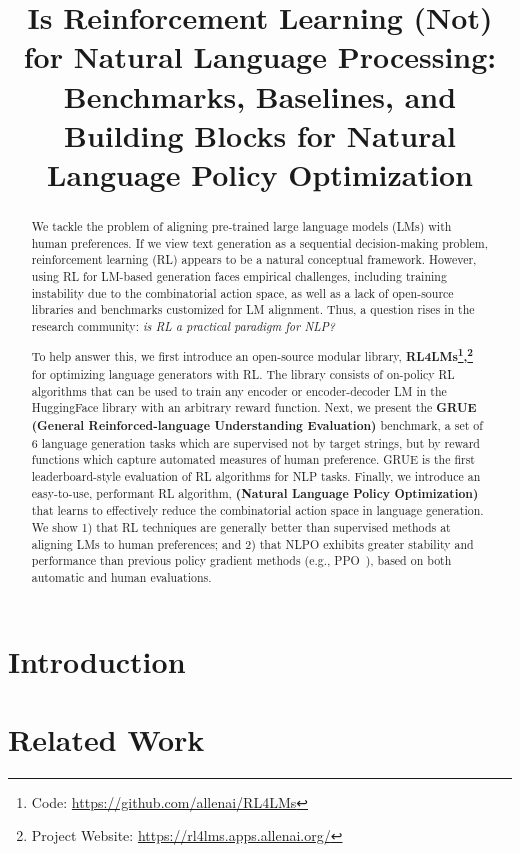 \title{Is Reinforcement Learning (Not) for Natural Language Processing: Benchmarks, Baselines, and Building Blocks for Natural Language Policy Optimization}

\begin{abstract}
{\let\thefootnote\relax{}} We tackle the problem of aligning pre-trained large language models (LMs) with human preferences. If we view text generation as a sequential decision-making problem, reinforcement learning (RL) appears to be a natural conceptual framework. However, using RL for LM-based generation faces empirical challenges, including training instability due to the combinatorial action space, as well as a lack of open-source libraries and benchmarks customized for LM alignment. Thus, a question rises in the research community:
\emph{is RL a practical paradigm for NLP?} 

To help answer this, we first introduce an open-source modular library,
\textbf{RL4LMs\footnote{Code: \url{https://github.com/allenai/RL4LMs}},\footnote{Project Website: \url{https://rl4lms.apps.allenai.org/}}} 
for optimizing language generators with RL. The library consists of on-policy RL algorithms that can be used to train any encoder or encoder-decoder LM in the HuggingFace library \citep{wolf2020transformers} with an arbitrary reward function. Next, we present the \textbf{GRUE (General Reinforced-language Understanding Evaluation)} benchmark, a set of 6 language generation tasks which are supervised not by target strings, but by reward functions which capture automated measures of human preference. GRUE is the first leaderboard-style evaluation of RL algorithms for NLP tasks. Finally, we introduce an easy-to-use, performant RL algorithm, \textbf{ (Natural Language Policy Optimization)} that learns to effectively reduce the combinatorial action space in language generation. We show 1) that RL techniques are generally better than supervised methods at aligning LMs to human preferences; and 2) that NLPO exhibits greater stability and performance than previous policy gradient methods (e.g., PPO~\citep{schulman2017proximal}), based on both automatic and human evaluations.
\end{abstract}

\section{Introduction} \label{sec:main/10_intro} 
\section{Related Work} \label{sec:main/20_background} 
